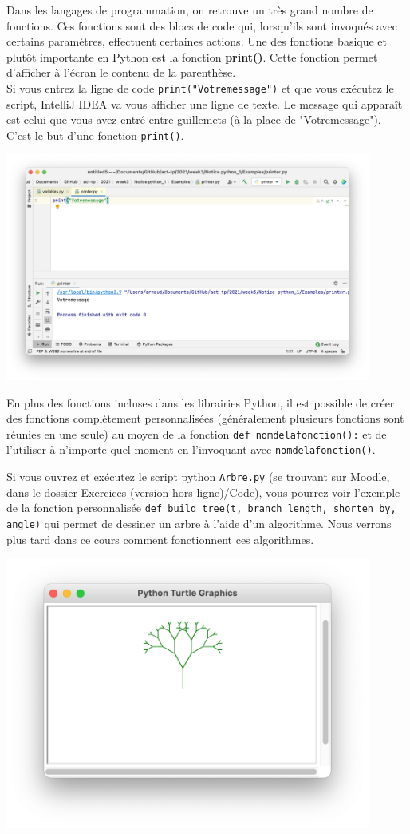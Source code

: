 Dans les langages de programmation, on retrouve un très grand nombre de fonctions. Ces fonctions sont des blocs de code qui, lorsqu'ils sont invoqués avec certains paramètres, effectuent certaines actions. Une des fonctions basique et plutôt importante en Python est la fonction \textbf{print()}.  Cette fonction permet d'afficher à l'écran le contenu de la parenthèse.\\ 
Si vous entrez la ligne de code \lstinline{print("Votremessage")} et que vous exécutez le script, IntelliJ IDEA va vous afficher une ligne de texte. Le message qui apparaît est celui que vous avez entré entre guillemets (à la place de "Votremessage"). C'est le but d'une fonction \lstinline{print()}.
\begin{center}
\includegraphics[width=12cm]{8}	
\end{center}


En plus des fonctions incluses dans les librairies Python, il est possible de créer des fonctions complètement personnalisées (généralement plusieurs fonctions sont réunies en une seule) au moyen de la fonction \lstinline{def nomdelafonction():} et de l'utiliser à n'importe quel moment en l'invoquant avec \lstinline{nomdelafonction()}.


Si vous ouvrez et exécutez le script python \lstinline{Arbre.py} (se trouvant sur Moodle, dans le dossier Exercices (version hors ligne)/Code), vous pourrez voir l'exemple de la fonction personnalisée \lstinline{def build_tree(t, branch_length, shorten_by, angle)} qui permet de dessiner un arbre à l'aide d'un algorithme. Nous verrons plus tard dans ce cours comment fonctionnent ces algorithmes.

\begin{center}
\includegraphics[width=12cm]{arbre.png}		
\end{center}


